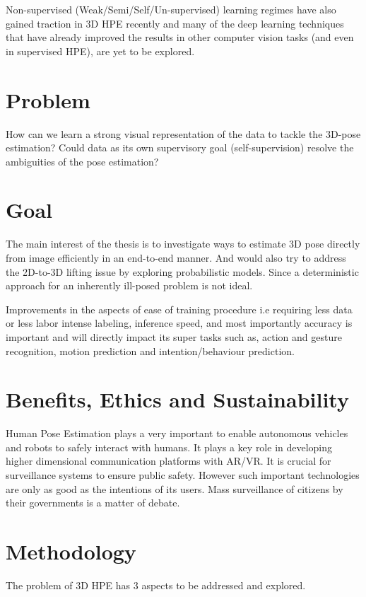 Non-supervised (Weak/Semi/Self/Un-supervised) learning regimes have also gained traction in 3D HPE recently and many of the deep learning techniques that have already improved the results in other computer vision tasks (and even in supervised HPE), are yet to be explored. 

\section{Problem}
How can we learn a strong visual representation of the data to tackle the 3D-pose
estimation? Could data as its own supervisory goal (self-supervision) resolve the
ambiguities of the pose estimation?


\section{Goal}

The main interest of the thesis is to investigate ways to estimate 3D pose directly from image efficiently in an end-to-end manner. And would also try to address the 2D-to-3D lifting issue by exploring probabilistic models. Since a deterministic approach for an inherently ill-posed problem is not ideal. 

Improvements in the aspects of ease of training procedure i.e requiring less data or less labor intense labeling, inference speed, and most importantly accuracy is important and will directly impact its super tasks such as, action and gesture recognition, motion prediction and intention/behaviour prediction.

\section{Benefits, Ethics and Sustainability}
Human Pose Estimation plays a very important to enable autonomous vehicles and robots to safely interact with humans. It plays a key role in developing higher dimensional communication platforms with AR/VR. It is crucial for surveillance systems to ensure public safety. However such important technologies are only as good as the intentions of its users. Mass surveillance of citizens by their governments is a matter of debate.  

\section{Methodology}

The problem of 3D HPE has 3 aspects to be addressed and explored. 

